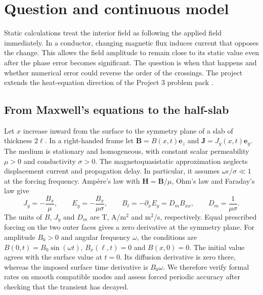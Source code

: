 \documentclass[11pt,a4paper]{article}
\begin{document}
\clearpage
\tableofcontents

\clearpage
\section{Question and continuous model}
Static calculations treat the interior field as following the applied field immediately. In a conductor, changing magnetic flux induces current that opposes the change. This allows the field amplitude to remain close to its static value even after the phase error becomes significant. The question is when that happens and whether numerical error could reverse the order of the crossings. The project extends the heat-equation direction of the Project 3 problem pack \cite{brief}.

\subsection{From Maxwell's equations to the half-slab}
Let $x$ increase inward from the surface to the symmetry plane of a slab of thickness $2\ell$. In a right-handed frame let $\mathbf B=B(x,t)\mathbf e_z$ and $\mathbf J=J_y(x,t)\mathbf e_y$. The medium is stationary and homogeneous, with constant scalar permeability $\mu>0$ and conductivity $\sigma>0$. The magnetoquasistatic approximation neglects displacement current and propagation delay. In particular, it assumes $\omega\epsilon/\sigma\ll 1$ at the forcing frequency. Amp\`ere's law with $\mathbf H=\mathbf B/\mu$, Ohm's law and Faraday's law give \cite{haus}
\begin{equation}
J_y=-\frac{B_x}{\mu},\qquad E_y=-\frac{B_x}{\mu\sigma},\qquad
B_t=-\partial_x E_y=D_mB_{xx},\qquad D_m=\frac{1}{\mu\sigma}.
\end{equation}
The units of $B$, $J_y$ and $D_m$ are T, A/m$^2$ and m$^2$/s, respectively. Equal prescribed forcing on the two outer faces gives a zero derivative at the symmetry plane. For amplitude $B_0>0$ and angular frequency $\omega$, the conditions are $B(0,t)=B_0\sin(\omega t)$, $B_x(\ell,t)=0$ and $B(x,0)=0$. The initial value agrees with the surface value at $t=0$. Its diffusion derivative is zero there, whereas the imposed surface time derivative is $B_0\omega$. We therefore verify formal rates on smooth compatible modes and assess forced periodic accuracy after checking that the transient has decayed.
\end{document}
